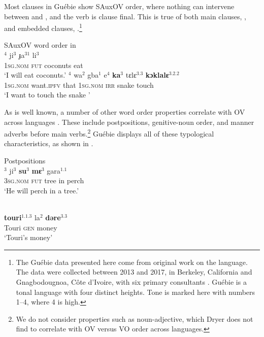 \documentclass[output=paper,newtxmath,modfonts,nonflat,draftmode]{langsci/langscibook}
\begin{document}
Most clauses in Guébie show SAuxOV order, where nothing can intervene between  and , and the verb is clause final. This is true of both main clauses, , and embedded clauses, .\footnote{The Guébie data presented here come from original work on the language. The data were collected between 2013 and 2017, in Berkeley, California and Gnagbodougnoa, Côte d'Ivoire, with six primary consultants \citep[cf.][]{Sande:2017}. Guébie is a tonal language with four distinct  heights. Tone is marked here with numbers 1--4, where 4 is high.}

\ea 
\ea SAuxOV word order in \\ 
$^{4}$ {ji}$^{3}$ {ɟa}$^{31}$ {li}$^{3}$  \\
\textsc{1sg}.\textsc{nom} \textsc{fut} coconuts eat \\
\glt `I will eat coconuts.'  \label{ex:sande:3a}
\ex {}$^{4}$ {wa}$^{2}$ {gba}$^{1}$ {e}$^{4}$ \textbf{{ka}$^{3}$} {tɛlɛ}$^{3.3}$ \textbf{{kɔklalɛ}$^{3.2.2}$} \\
\textsc{1sg}.\textsc{nom} want.\textsc{ipfv} that \textsc{1sg}.\textsc{nom} \textsc{irr} snake touch \\
\glt `I want to touch the snake ' \label{ex:sande:3b}
\z
\z


As is well known, a number of other word order properties correlate with OV across languages \citep{Greenberg:1963, dryer07}. These include postpositions, genitive-noun order, and manner adverbs before main verbs.\footnote{We do not consider properties such as noun-adjective, which Dryer does not find to correlate with OV versus VO order across languages.} Guébie displays all of these typological characteristics, as shown in .

\ea {} \label{ex:4:Guebie} 
\ea Postpositions\\
$^{3}$ {ji}$^{3}$ \textbf{{su}$^{3}$} \textbf{{mɛ}$^{3}$} {gara}$^{1.1}$ \\
\textsc{3sg}.\textsc{nom} \textsc{fut} tree in perch\\
\glt  `He will perch in a tree.' 

\\
\gll \textbf{{touri}$^{1.1.3}$} {la}$^{2}$ \textbf{{dəre}$^{3.3}$}\\
Touri \textsc{gen} money\\
\glt `Touri's money'
\end{document}

